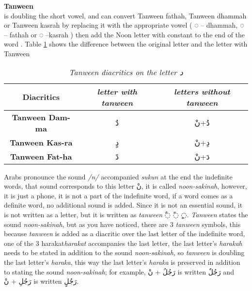 \begin{definition}\label{def:tanween_definition}
  \textbf{Tanween} \hfill \\
  is doubling the short vowel, and can convert
Tanween fathah, Tanween dhammah or Tanween kasrah by
replacing it with the appropriate vowel ( ُ◌ – dhammah, َ◌ –
fathah or ِ◌ –kasrah ) then add the Noon letter with constant to the end of the word \cite{Alnagdawi2013}. Table \ref{tables:Tanween_dal}
shows the difference between the original letter and the letter with Tanween

\begin{table}[H]
	\centering
	\begin{tabular}{c c c}
		\toprule
		\textbf{\small{Diacritics}} & \small{\textit{letter with tanween }} & \small{\textit{letters without tanween}} \\
		\midrule
          \textbf{\small{Tanween Dam-ma}}  & \textarabic{دٌ} &  \textarabic{دُ+نْ}\\
          \textbf{\small{Tanween Kas-ra}}  & \textarabic{دٍ} &  \textarabic{دِ+نْ}\\
          \textbf{\small{Tanween Fat-ha}}  & \textarabic{دً} &  \textarabic{دَ+نْ}\\
        
	
		\bottomrule
	\end{tabular}
	\caption{\textit{Tanween diacritics on the letter  \textarabic{ د }}} \label{tables:Tanween_dal}
\end{table}


\end{definition}

 Arabs pronounce the sound \textit{/n/} accompanied \textit{sukun} at the end the indefinite words, that sound corresponds to this
letter \textarabic{نْ}, it is called \textit{noon-sakinah}, however, it is
just a phone, it is not a part of the indefinite word, if a word comes as a
definite word, no additional sound is added. Since it is not an essential sound,
it is not written as a letter, but it is written as  \textit{tanween}
\textarabic{◌ٌ ◌ً ◌ٍ}.
\textit{Tanween} states the sound \textit{noon-sakinah}, but as you have noticed,
there are 3 \textit{tanween} symbols, this because  \textit{tanween} is added as
a diacritic over the last letter of the indefinite word, one of the 3 harakat\textit{harakat} accompanies the last letter, the last letter's \textit{harakah}
needs to be stated in addition to the sound \textit{noon-sakinah}, so
\textit{tanween} is doubling the last letter's \textit{haraka}, this way the last
letter's \textit{haraka} is preserved in addition to stating the sound
\textit{noon-sakinah}; for example, \textarabic{رَجُلُ + نْ} is written
\textarabic{رَجُلٌ} and  \textarabic{رَجُلِ + نْ} is written \textarabic{رَجُلٍ}. 


